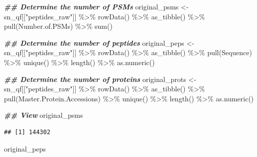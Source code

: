 \documentclass[9pt,a4paper,]{extarticle}
\newenvironment{Shaded}{\begin{snugshade}}{\end{snugshade}}
\newcommand{\DocumentationTok}[1]{\textcolor[rgb]{0.56,0.35,0.01}{\textbf{\textit{#1}}}}
\newcommand{\FunctionTok}[1]{\textcolor[rgb]{0.00,0.00,0.00}{#1}}
\newcommand{\NormalTok}[1]{#1}
\newcommand{\OtherTok}[1]{\textcolor[rgb]{0.56,0.35,0.01}{#1}}
\newcommand{\SpecialCharTok}[1]{\textcolor[rgb]{0.00,0.00,0.00}{#1}}
\newcommand{\StringTok}[1]{\textcolor[rgb]{0.31,0.60,0.02}{#1}}
\begin{document}
\begin{Shaded}
\begin{Highlighting}[]
\DocumentationTok{\#\# Determine the number of PSMs}
\NormalTok{original\_psms }\OtherTok{\textless{}{-}}\NormalTok{ sn\_qf[[}\StringTok{"peptides\_raw"}\NormalTok{]] }\SpecialCharTok{\%\textgreater{}\%} 
  \FunctionTok{rowData}\NormalTok{() }\SpecialCharTok{\%\textgreater{}\%} 
  \FunctionTok{as\_tibble}\NormalTok{() }\SpecialCharTok{\%\textgreater{}\%} 
  \FunctionTok{pull}\NormalTok{(Number.of.PSMs) }\SpecialCharTok{\%\textgreater{}\%} 
  \FunctionTok{sum}\NormalTok{() }

\DocumentationTok{\#\# Determine the number of peptides}
\NormalTok{original\_peps }\OtherTok{\textless{}{-}}\NormalTok{ sn\_qf[[}\StringTok{"peptides\_raw"}\NormalTok{]] }\SpecialCharTok{\%\textgreater{}\%} 
  \FunctionTok{rowData}\NormalTok{() }\SpecialCharTok{\%\textgreater{}\%} 
  \FunctionTok{as\_tibble}\NormalTok{() }\SpecialCharTok{\%\textgreater{}\%} 
  \FunctionTok{pull}\NormalTok{(Sequence) }\SpecialCharTok{\%\textgreater{}\%} 
  \FunctionTok{unique}\NormalTok{() }\SpecialCharTok{\%\textgreater{}\%}
  \FunctionTok{length}\NormalTok{() }\SpecialCharTok{\%\textgreater{}\%}
  \FunctionTok{as.numeric}\NormalTok{() }

\DocumentationTok{\#\# Determine the number of proteins}
\NormalTok{original\_prots }\OtherTok{\textless{}{-}}\NormalTok{ sn\_qf[[}\StringTok{"peptides\_raw"}\NormalTok{]] }\SpecialCharTok{\%\textgreater{}\%}
  \FunctionTok{rowData}\NormalTok{() }\SpecialCharTok{\%\textgreater{}\%} 
  \FunctionTok{as\_tibble}\NormalTok{() }\SpecialCharTok{\%\textgreater{}\%} 
  \FunctionTok{pull}\NormalTok{(Master.Protein.Accessions) }\SpecialCharTok{\%\textgreater{}\%} 
  \FunctionTok{unique}\NormalTok{() }\SpecialCharTok{\%\textgreater{}\%} 
  \FunctionTok{length}\NormalTok{() }\SpecialCharTok{\%\textgreater{}\%}
  \FunctionTok{as.numeric}\NormalTok{()}

\DocumentationTok{\#\# View}
\NormalTok{original\_psms}
\end{Highlighting}
\end{Shaded}

\begin{verbatim}
## [1] 144302
\end{verbatim}

\begin{Shaded}
\begin{Highlighting}[]
\NormalTok{original\_peps}
\end{Highlighting}
\end{Shaded}
\end{document}
